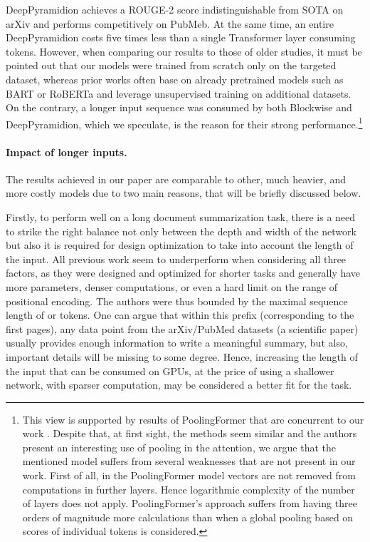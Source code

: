 \documentclass{article}
\begin{document}
 DeepPyramidion achieves a ROUGE-2 score indistinguishable from SOTA on arXiv and performs competitively on PubMeb. At the same time, an entire DeepPyramidion costs five times less than a single Transformer layer consuming  tokens. However, when comparing our results to those of older studies, it must be pointed out that our models were trained from scratch only on the targeted dataset, whereas prior works often base on already pretrained models such as BART or RoBERTa and leverage unsupervised training on additional datasets. On the contrary, a longer input sequence was consumed by both Blockwise and DeepPyramidion, which we speculate, is the reason for their strong performance.\footnote{ This view is supported by results of PoolingFormer that are concurrent to our work \citep{zhang2021poolingformer}. Despite that, at first sight, the methods seem similar and the authors present an interesting use of pooling in the attention, we argue that the mentioned model suffers from several weaknesses that are not present in our work. First of all, in the PoolingFormer model vectors are not removed from computations in further layers. Hence logarithmic complexity of the number of layers does not apply. PoolingFormer's approach suffers from having three orders of magnitude more calculations than when a global pooling based on scores of individual tokens is considered.}

\paragraph{Impact of longer inputs.}
The results achieved in our paper are comparable to other, much heavier, and more costly models due to two main reasons, that will be briefly discussed below.

Firstly, to perform well on a long document summarization task, there is a need to strike the right balance not only between the depth and width of the network but also it is required for design optimization to take into account the length of the input. All previous work seem to underperform when considering all three factors, as they were designed and optimized for shorter tasks and generally have more parameters, denser computations, or even a hard limit on the range of positional encoding. The authors were thus bounded by the maximal sequence length of  or  tokens. One can argue that within this prefix (corresponding to the first  pages), any data point from the arXiv/PubMed datasets (a scientific paper) usually provides enough information to write a meaningful summary, but also, important details will be missing to some degree. Hence, increasing the length of the input that can be consumed on GPUs, at the price of using a shallower network, with sparser computation, may be considered a better fit for the task.
\end{document}
